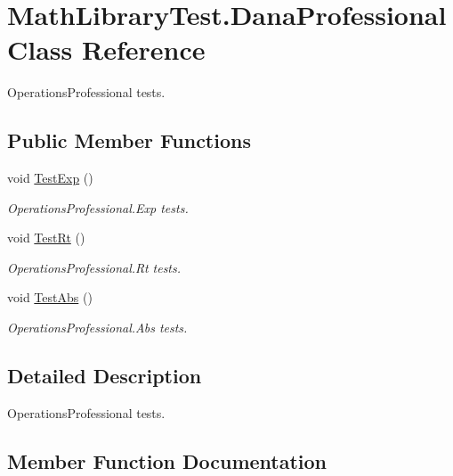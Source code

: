 \hypertarget{classMathLibraryTest_1_1DanaProfessional}{}\section{Math\+Library\+Test.\+Dana\+Professional Class Reference}
\label{classMathLibraryTest_1_1DanaProfessional}


Operations\+Professional tests.  


\subsection*{Public Member Functions}
\begin{DoxyCompactItemize}
\item 
void \hyperlink{classMathLibraryTest_1_1DanaProfessional_a57932b88ac96d31c774b02fe1c23c8ee}{Test\+Exp} ()
\begin{DoxyCompactList}\small\item\em Operations\+Professional.\+Exp tests. \end{DoxyCompactList}\item 
void \hyperlink{classMathLibraryTest_1_1DanaProfessional_a7ab9375202b08f4990dbd7f97fb9ba54}{Test\+Rt} ()
\begin{DoxyCompactList}\small\item\em Operations\+Professional.\+Rt tests. \end{DoxyCompactList}\item 
void \hyperlink{classMathLibraryTest_1_1DanaProfessional_a21d72d33ba0efcbbe8b693075630ac6f}{Test\+Abs} ()
\begin{DoxyCompactList}\small\item\em Operations\+Professional.\+Abs tests. \end{DoxyCompactList}\end{DoxyCompactItemize}


\subsection{Detailed Description}
Operations\+Professional tests. 

\subsection{Member Function Documentation}
\mbox{\label{classMathLibraryTest_1_1DanaProfessional_a21d72d33ba0efcbbe8b693075630ac6f}} 
